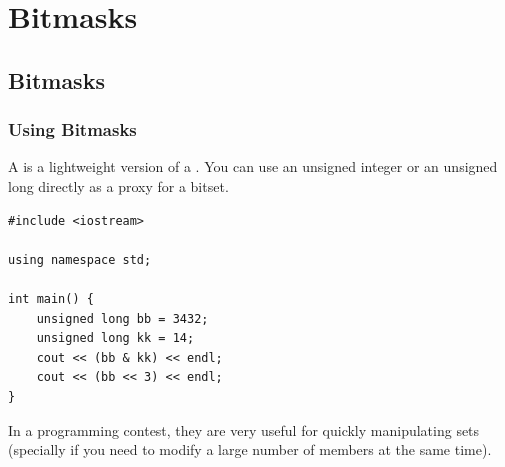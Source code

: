 \documentclass{beamer}
\begin{document}


\section{Bitmasks}
\subsection{Bitmasks}

\begin{frame}
  \frametitle{Using Bitmasks}
  {\smaller
  A  is a lightweight version of a
  . You can use an unsigned integer or an unsigned
  long directly as a proxy for a bitset.

  \begin{block}{}
\begin{verbatim}
#include <iostream>

using namespace std;

int main() {
    unsigned long bb = 3432;
    unsigned long kk = 14;
    cout << (bb & kk) << endl;
    cout << (bb << 3) << endl;
}
\end{verbatim}
  \end{block}

  In a programming contest, they are very useful for quickly
  manipulating sets (specially if you need to modify a large number of
  members at the same time).
  }
\end{frame}
\end{document}
